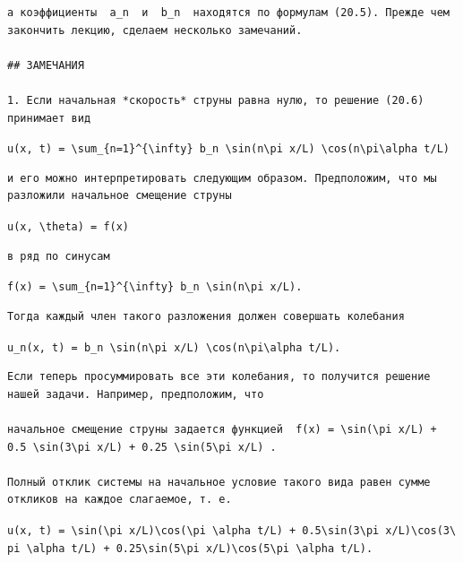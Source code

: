 \documentclass[
  ukrainian,
]{article}
\begin{document}
\begin{verbatim}
а коэффициенты  a_n  и  b_n  находятся по формулам (20.5). Прежде чем закончить лекцию, сделаем несколько замечаний.

## ЗАМЕЧАНИЯ

1. Если начальная *скорость* струны равна нулю, то решение (20.6) принимает вид
\end{verbatim}

\texttt{u(x,\ t)\ =\ \textbackslash{}sum\_\{n=1\}\^{}\{\textbackslash{}infty\}\ b\_n\ \textbackslash{}sin(n\textbackslash{}pi\ x/L)\ \textbackslash{}cos(n\textbackslash{}pi\textbackslash{}alpha\ t/L)}

\begin{verbatim}
и его можно интерпретировать следующим образом. Предположим, что мы разложили начальное смещение струны
\end{verbatim}

\texttt{u(x,\ \textbackslash{}theta)\ =\ f(x)}

\begin{verbatim}
в ряд по синусам
\end{verbatim}

\texttt{f(x)\ =\ \textbackslash{}sum\_\{n=1\}\^{}\{\textbackslash{}infty\}\ b\_n\ \textbackslash{}sin(n\textbackslash{}pi\ x/L).}

\begin{verbatim}
Тогда каждый член такого разложения должен совершать колебания
\end{verbatim}

\texttt{u\_n(x,\ t)\ =\ b\_n\ \textbackslash{}sin(n\textbackslash{}pi\ x/L)\ \textbackslash{}cos(n\textbackslash{}pi\textbackslash{}alpha\ t/L).}

\begin{verbatim}
Если теперь просуммировать все эти колебания, то получится решение нашей задачи. Например, предположим, что

начальное смещение струны задается функцией  f(x) = \sin(\pi x/L) + 0.5 \sin(3\pi x/L) + 0.25 \sin(5\pi x/L) .

Полный отклик системы на начальное условие такого вида равен сумме откликов на каждое слагаемое, т. е.
\end{verbatim}

\texttt{u(x,\ t)\ =\ \textbackslash{}sin(\textbackslash{}pi\ x/L)\textbackslash{}cos(\textbackslash{}pi\ \textbackslash{}alpha\ t/L)\ +\ 0.5\textbackslash{}sin(3\textbackslash{}pi\ x/L)\textbackslash{}cos(3\textbackslash{}pi\ \textbackslash{}alpha\ t/L)\ +\ 0.25\textbackslash{}sin(5\textbackslash{}pi\ x/L)\textbackslash{}cos(5\textbackslash{}pi\ \textbackslash{}alpha\ t/L).}
\end{document}
